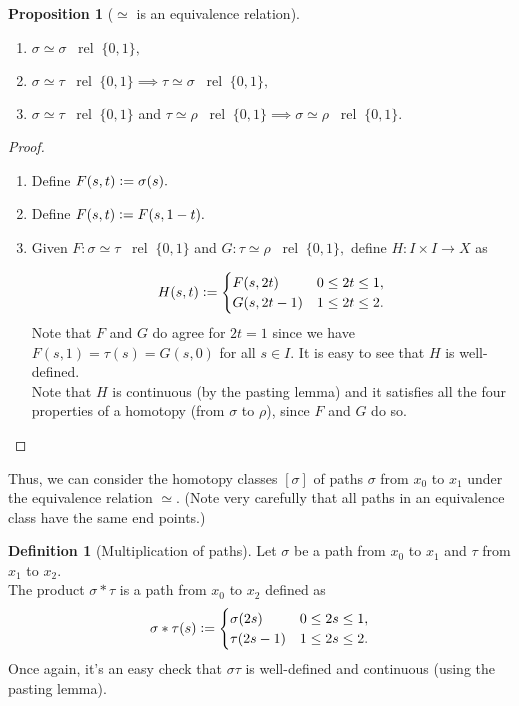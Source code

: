 \documentclass[12pt]{article}
\theoremstyle{definition}
\numberwithin{thm}{section}
\newtheorem{defn}[thm]{Definition}
\newtheorem{prop}[thm]{Proposition}
\newcommand{\rel}{\;\;\operatorname{rel}\;}
\begin{document}
\begin{prop}[$\simeq$ is an equivalence relation] \label{prop:equivrel}
	\phantom{hi}
	
	\begin{enumerate}
		\item $\sigma \simeq \sigma \rel \{0, 1\},$
		\item $\sigma \simeq \tau \rel \{0, 1\} \implies \tau \simeq \sigma \rel \{0, 1\},$
		\item $\sigma \simeq \tau \rel \{0, 1\}$ and $\tau \simeq \rho \rel \{0, 1\} \implies \sigma \simeq \rho \rel \{0, 1\}.$ 
	\end{enumerate}
\end{prop}
\begin{proof} 
	\begin{enumerate}
		\item Define $F(s, t) \vcentcolon= \sigma(s).$
		\item Define $F(s, t) \vcentcolon= F(s, 1 - t).$
		\item Given $F:\sigma \simeq \tau \rel \{0, 1\}$ and $G:\tau \simeq \rho \rel \{0, 1\},$ define $H:I \times I \to X$ as

		\begin{equation*} 
			H(s, t) \vcentcolon= \begin{cases}
				F(s, 2t) & 0 \le 2t \le 1,\\
				G(s, 2t - 1) & 1 \le 2t \le 2.
			\end{cases}
		\end{equation*}
		Note that $F$ and $G$ do agree for $2t = 1$ since we have $F(s, 1) = \tau(s) = G(s, 0)$ for all $s \in I.$ It is easy to see that $H$ is well-defined.\\
		Note that $H$ is continuous (by the pasting lemma) and it satisfies all the four properties of a homotopy (from $\sigma$ to $\rho$), since $F$ and $G$ do so. \qedhere
	\end{enumerate}
\end{proof}
Thus, we can consider the homotopy classes $[\sigma]$ of paths $\sigma$ from $x_0$ to $x_1$ under the equivalence relation $\simeq.$ (Note very carefully that all paths in an equivalence class have the same end points.)

\begin{defn}[Multiplication of paths]
	Let $\sigma$ be a path from $x_0$ to $x_1$ and $\tau$ from $x_1$ to $x_2.$\\
	The product $\sigma*\tau$ is a path from $x_0$ to $x_2$ defined as
	\begin{equation*} 
		\sigma*\tau(s) \vcentcolon= \begin{cases}
			\sigma(2s) & 0 \le 2s \le 1,\\
			\tau(2s - 1) & 1 \le 2s \le 2.
		\end{cases}
	\end{equation*}
	Once again, it's an easy check that $\sigma\tau$ is well-defined and continuous (using the pasting lemma).
\end{defn}
\end{document}

